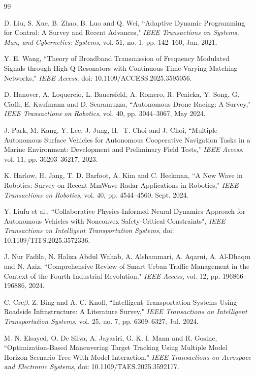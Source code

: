 \documentclass[fleqn,10pt]{wlscirep}
\begin{document}
\begin{thebibliography}{99}

 D. Liu, S. Xue, B. Zhao, B. Luo and Q. Wei, ``Adaptive Dynamic Programming for Control: A Survey and Recent Advances," \emph{IEEE Transactions on Systems, Man, and Cybernetics: Systems}, vol. 51, no. 1, pp. 142--160, Jan. 2021.

 Y. E. Wang, ``Theory of Broadband Transmission of Frequency Modulated Signals through High-Q Resonators with Continuous Time-Varying Matching Networks," \emph{IEEE Access}, doi: 10.1109/ACCESS.2025.3595056.


 D. Hanover, A. Loquercio, L. Bauersfeld, A. Romero, R. Penicka, Y. Song, G. Cioffi, E.  Kaufmann and D. Scaramuzza, ``Autonomous Drone Racing: A Survey," \emph{IEEE Transactions on Robotics}, vol. 40, pp. 3044--3067, May 2024.

 J. Park, M. Kang, Y. Lee, J. Jung, H. -T. Choi and J. Choi, ``Multiple Autonomous Surface Vehicles for Autonomous Cooperative Navigation Tasks in a Marine Environment: Development and Preliminary Field Tests," \emph{IEEE Access}, vol. 11, pp. 36203--36217, 2023.

 K. Harlow, H. Jang, T. D. Barfoot, A. Kim and C. Heckman, ``A New Wave in Robotics: Survey on Recent MmWave Radar Applications in Robotics," \emph{IEEE Transactions on Robotics}, vol. 40, pp. 4544--4560, Sept. 2024.

 Y. Liufu et al., ``Collaborative Physics-Informed Neural Dynamics Approach for Autonomous Vehicles with Nonconvex Safety-Critical Constraints", \emph{IEEE Transactions on Intelligent Transportation Systems}, doi: 10.1109/TITS.2025.3572336.


 J. Nur Fadila, N. Haliza Abdul Wahab, A. Alshammari, A. Aqarni, A. Al-Dhaqm and N. Aziz, ``Comprehensive Review of Smart Urban Traffic Management in the Context of the Fourth Industrial Revolution,"  \emph{IEEE Access}, vol. 12, pp. 196866--196886, 2024.


 C. Cre$\beta$, Z. Bing and A. C. Knoll, ``Intelligent Transportation Systems Using Roadside Infrastructure: A Literature Survey," \emph{IEEE Transactions on Intelligent Transportation Systems}, vol. 25, no. 7, pp. 6309--6327, Jul. 2024.


 M. N. Elsayed, O. De Silva, A. Jayasiri, G. K. I. Mann and R. Gosine, ``Optimization-Based Maneuvering Target Tracking Using Multiple Model Horizon Scenario Tree With Model Interaction," \emph{IEEE Transactions on Aerospace and Electronic Systems}, doi: 10.1109/TAES.2025.3592177.


\end{thebibliography}
\end{document}
